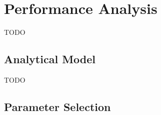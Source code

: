 \section{Performance Analysis}
TODO


\subsection{Analytical Model}
TODO

\subsection{Parameter Selection}


